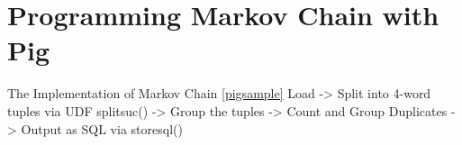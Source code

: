 \section{Programming Markov Chain with Pig}                                              

The Implementation of Markov Chain \ref{pigsample}
Load -> Split into 4-word tuples via UDF splitsuc() -> Group the tuples -> Count and Group Duplicates -> Output as SQL via storesql()